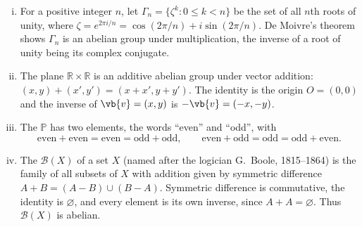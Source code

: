 \begin{eg}
\begin{enumerate}[(i)]
		      is its complex conjugate. Although \(S^1\) is abelian we still write it
		      multiplicatively.
		\item For a positive integer \(n\), let
		      \(\Gamma_n = \{\zeta^k : 0 \leq k < n\}\) be the set of all \(n\)th roots of
		      unity, where \(\zeta = e^{2\pi i/n} = \cos(2\pi/n) + i\sin(2\pi/n)\). De
		      Moivre's theorem shows \(\Gamma_n\) is an abelian group under multiplication,
		      the inverse of a root of unity being its complex conjugate.
		\item The plane \(\mathbb{R} \times \mathbb{R}\) is an additive abelian group under
		      vector addition: \((x,y) + (x',y') = (x+x', y+y')\). The identity is the
		      origin \(O = (0,0)\) and the inverse of \(\vb{v} = (x,y)\) is
		      \(-\vb{v} = (-x,-y)\).
		\item The  \(\mathbb{P}\) has two elements, the words ``even''
		      and ``odd'', with
		      \[
			      \text{even} + \text{even} = \text{even} = \text{odd} + \text{odd},
			      \qquad
			      \text{even} + \text{odd} = \text{odd} = \text{odd} + \text{even}.
		      \]
		\item The  \(\mathcal{B}(X)\) of a set \(X\) (named after the
		      logician G.~Boole, 1815--1864) is the family of all subsets of \(X\) with
		      addition given by symmetric difference
		      \(A + B = (A - B) \cup (B - A)\). Symmetric difference is commutative, the
		      identity is \(\varnothing\), and every element is its own inverse, since
		      \(A + A = \varnothing\). Thus \(\mathcal{B}(X)\) is abelian.
	\end{enumerate}
\end{eg}

